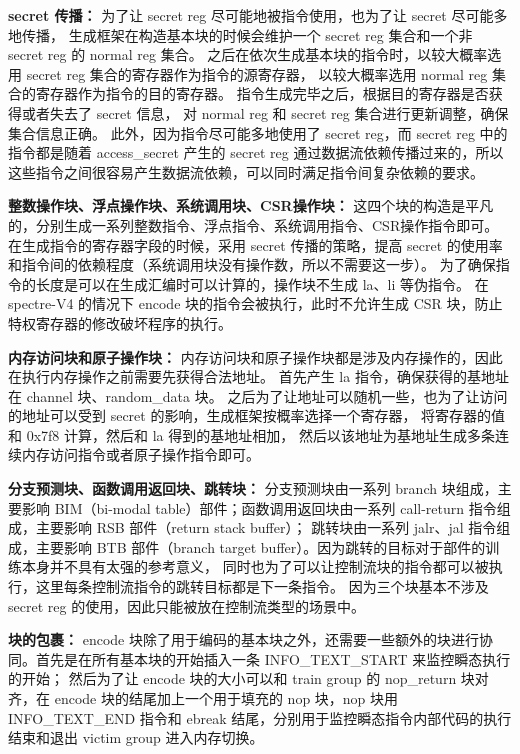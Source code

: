\textbf{secret 传播：}
为了让 secret reg 尽可能地被指令使用，也为了让 secret 尽可能多地传播，
生成框架在构造基本块的时候会维护一个 secret reg 集合和一个非 secret reg 的 normal reg 集合。
之后在依次生成基本块的指令时，以较大概率选用 secret reg 集合的寄存器作为指令的源寄存器，
以较大概率选用 normal reg 集合的寄存器作为指令的目的寄存器。
指令生成完毕之后，根据目的寄存器是否获得或者失去了 secret 信息，
对 normal reg 和 secret reg 集合进行更新调整，确保集合信息正确。
此外，因为指令尽可能多地使用了 secret reg，而 secret reg 中的指令都是随着 access\_secret 产生的 secret reg
通过数据流依赖传播过来的，所以这些指令之间很容易产生数据流依赖，可以同时满足指令间复杂依赖的要求。\par

\textbf{整数操作块、浮点操作块、系统调用块、CSR操作块：}
这四个块的构造是平凡的，分别生成一系列整数指令、浮点指令、系统调用指令、CSR操作指令即可。
在生成指令的寄存器字段的时候，采用 secret 传播的策略，提高 secret 的使用率和指令间的依赖程度（系统调用块没有操作数，所以不需要这一步）。
为了确保指令的长度是可以在生成汇编时可以计算的，操作块不生成 la、li 等伪指令。
在 spectre-V4 的情况下 encode 块的指令会被执行，此时不允许生成 CSR 块，防止特权寄存器的修改破坏程序的执行。\par

\textbf{内存访问块和原子操作块：}
内存访问块和原子操作块都是涉及内存操作的，因此在执行内存操作之前需要先获得合法地址。
首先产生 la 指令，确保获得的基地址在 channel 块、random\_data 块。
之后为了让地址可以随机一些，也为了让访问的地址可以受到 secret 的影响，生成框架按概率选择一个寄存器，
将寄存器的值和 0x7f8 计算，然后和 la 得到的基地址相加，
然后以该地址为基地址生成多条连续内存访问指令或者原子操作指令即可。\par

\textbf{分支预测块、函数调用返回块、跳转块：}
分支预测块由一系列 branch 块组成，主要影响 BIM（bi-modal table）部件；函数调用返回块由一系列 call-return 指令组成，主要影响 RSB 部件（return stack buffer）；
跳转块由一系列 jalr、jal 指令组成，主要影响 BTB 部件（branch target buffer）。因为跳转的目标对于部件的训练本身并不具有太强的参考意义，
同时也为了可以让控制流块的指令都可以被执行，这里每条控制流指令的跳转目标都是下一条指令。
因为三个块基本不涉及 secret reg 的使用，因此只能被放在控制流类型的场景中。\par

\textbf{块的包裹：}
encode 块除了用于编码的基本块之外，还需要一些额外的块进行协同。首先是在所有基本块的开始插入一条 INFO\_TEXT\_START 来监控瞬态执行的开始；
然后为了让 encode 块的大小可以和 train group 的 nop\_return 块对齐，在 encode 块的结尾加上一个用于填充的 nop 块，nop 块用 INFO\_TEXT\_END 指令和
ebreak 结尾，分别用于监控瞬态指令内部代码的执行结束和退出 victim group 进入内存切换。\par

